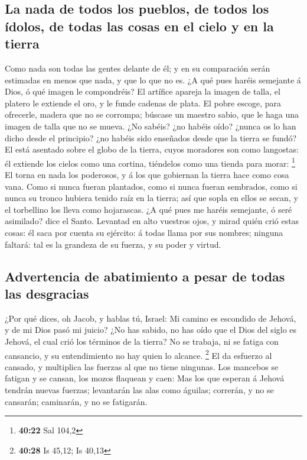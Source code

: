 \hypertarget{la-nada-de-todos-los-pueblos-de-todos-los-uxeddolos-de-todas-las-cosas-en-el-cielo-y-en-la-tierra}{%
\subsection{La nada de todos los pueblos, de todos los ídolos, de todas
las cosas en el cielo y en la
tierra}\label{la-nada-de-todos-los-pueblos-de-todos-los-uxeddolos-de-todas-las-cosas-en-el-cielo-y-en-la-tierra}}

 Como nada son todas las gentes delante de él; y en su
comparación serán estimadas en menos que nada, y que lo que no es.
 ¿A qué pues haréis semejante á Dios, ó qué imagen le
compondréis?  El artífice apareja la imagen de talla, el
platero le extiende el oro, y le funde cadenas de plata. 
El pobre escoge, para ofrecerle, madera que no se corrompa; búscase un
maestro sabio, que le haga una imagen de talla que no se mueva.
 ¿No sabéis? ¿no habéis oído? ¿nunca os lo han dicho
desde el principio? ¿no habéis sido enseñados desde que la tierra se
fundó?  El está asentado sobre el globo de la tierra,
cuyos moradores son como langostas: él extiende los cielos como una
cortina, tiéndelos como una tienda para morar: \footnote{\textbf{40:22}
  Sal 104,2}  El torna en nada los poderosos, y á los que
gobiernan la tierra hace como cosa vana.  Como si nunca
fueran plantados, como si nunca fueran sembrados, como si nunca su
tronco hubiera tenido raíz en la tierra; así que sopla en ellos se
secan, y el torbellino los lleva como hojarascas.  ¿A qué
pues me haréis semejante, ó seré asimilado? dice el Santo.
 Levantad en alto vuestros ojos, y mirad quién crió estas
cosas: él saca por cuenta su ejército: á todas llama por sus nombres;
ninguna faltará: tal es la grandeza de su fuerza, y su poder y virtud.

\hypertarget{advertencia-de-abatimiento-a-pesar-de-todas-las-desgracias}{%
\subsection{Advertencia de abatimiento a pesar de todas las
desgracias}\label{advertencia-de-abatimiento-a-pesar-de-todas-las-desgracias}}

 ¿Por qué dices, oh Jacob, y hablas tú, Israel: Mi camino
es escondido de Jehová, y de mi Dios pasó mi juicio?  ¿No
has sabido, no has oído que el Dios del siglo es Jehová, el cual crió
los términos de la tierra? No se trabaja, ni se fatiga con cansancio, y
su entendimiento no hay quien lo alcance. \footnote{\textbf{40:28} Is
  45,12; Is 40,13}  El da esfuerzo al cansado, y
multiplica las fuerzas al que no tiene ningunas.  Los
mancebos se fatigan y se cansan, los mozos flaquean y caen:
 Mas los que esperan á Jehová tendrán nuevas fuerzas;
levantarán las alas como águilas; correrán, y no se cansarán; caminarán,
y no se fatigarán.

